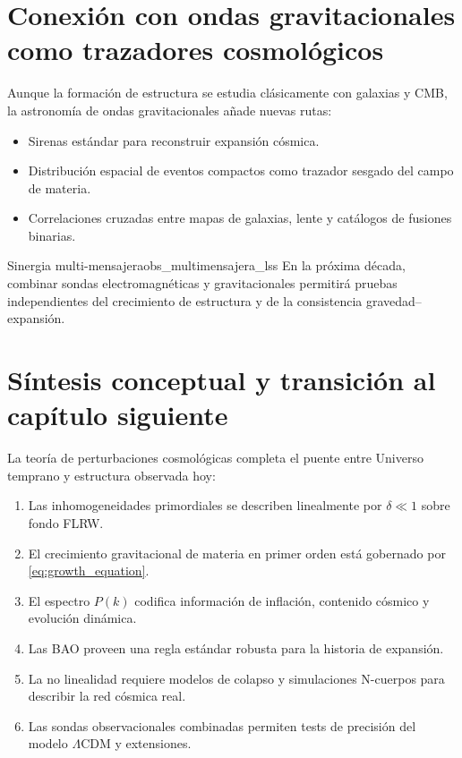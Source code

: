 \section{Conexión con ondas gravitacionales como trazadores cosmológicos}
\label{sec:conexion_og}

Aunque la formación de estructura se estudia clásicamente con galaxias y CMB, la astronomía de ondas gravitacionales añade nuevas rutas:
\begin{itemize}[leftmargin=2em]
  \item Sirenas estándar para reconstruir expansión cósmica.
  \item Distribución espacial de eventos compactos como trazador sesgado del campo de materia.
  \item Correlaciones cruzadas entre mapas de galaxias, lente y catálogos de fusiones binarias.
\end{itemize}

\begin{observacion}{Sinergia multi-mensajera}{obs_multimensajera_lss}
En la próxima década, combinar sondas electromagnéticas y gravitacionales permitirá pruebas independientes del crecimiento de estructura y de la consistencia gravedad--expansión.
\end{observacion}

\section{Síntesis conceptual y transición al capítulo siguiente}
\label{sec:sintesis_cap14}

La teoría de perturbaciones cosmológicas completa el puente entre Universo temprano y estructura observada hoy:
\begin{enumerate}[leftmargin=2em, label=\textbf{\arabic*.}]
  \item Las inhomogeneidades primordiales se describen linealmente por $\delta\ll1$ sobre fondo FLRW.
  \item El crecimiento gravitacional de materia en primer orden está gobernado por \eqref{eq:growth_equation}.
  \item El espectro $P(k)$ codifica información de inflación, contenido cósmico y evolución dinámica.
  \item Las BAO proveen una regla estándar robusta para la historia de expansión.
  \item La no linealidad requiere modelos de colapso y simulaciones N-cuerpos para describir la red cósmica real.
  \item Las sondas observacionales combinadas permiten tests de precisión del modelo $\Lambda$CDM y extensiones.
\end{enumerate}

